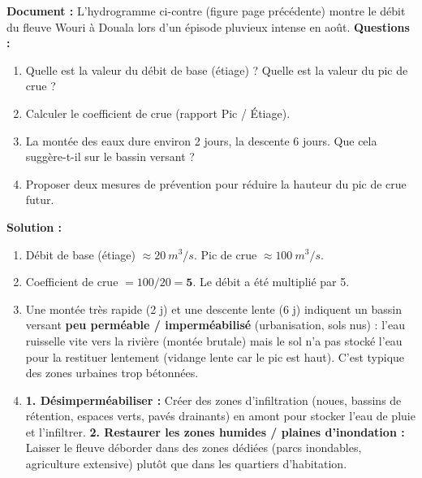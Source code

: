 \documentclass[11pt]{article}
\begin{document}
\begin{exoresolu}
\textbf{Document :} L'hydrogramme ci-contre (figure page précédente) montre le débit du fleuve Wouri à Douala lors d'un épisode pluvieux intense en août.
\textbf{Questions :}
\begin{enumerate}
    \item Quelle est la valeur du débit de base (étiage) ? Quelle est la valeur du pic de crue ?
    \item Calculer le coefficient de crue (rapport Pic / Étiage).
    \item La montée des eaux dure environ 2 jours, la descente 6 jours. Que cela suggère-t-il sur le bassin versant ?
    \item Proposer deux mesures de prévention pour réduire la hauteur du pic de crue futur.
\end{enumerate}
\tcblower
\textbf{Solution :}
\begin{enumerate}
    \item Débit de base (étiage) $\approx \SI{20}{m^3/s}$. Pic de crue $\approx \SI{100}{m^3/s}$.
    \item Coefficient de crue $= 100 / 20 = \mathbf{5}$. Le débit a été multiplié par 5.
    \item Une montée très rapide (2 j) et une descente lente (6 j) indiquent un bassin versant \textbf{peu perméable / imperméabilisé} (urbanisation, sols nus) : l'eau ruisselle vite vers la rivière (montée brutale) mais le sol n'a pas stocké l'eau pour la restituer lentement (vidange lente car le pic est haut). C'est typique des zones urbaines trop bétonnées.
    \item \textbf{1. Désimperméabiliser :} Créer des zones d'infiltration (noues, bassins de rétention, espaces verts, pavés drainants) en amont pour stocker l'eau de pluie et l'infiltrer. \textbf{2. Restaurer les zones humides / plaines d'inondation :} Laisser le fleuve déborder dans des zones dédiées (parcs inondables, agriculture extensive) plutôt que dans les quartiers d'habitation.
\end{enumerate}
\end{exoresolu}
\end{document}

